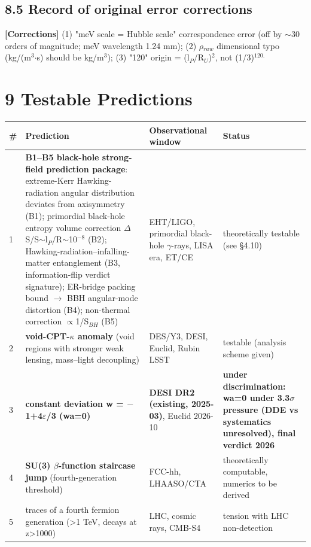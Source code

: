 \documentclass[12pt]{article}
\newcommand{\mtag}[1]{\textbf{[#1]}}
\newcommand{\up}[1]{\ensuremath{^{#1}}}
\newcommand{\down}[1]{\ensuremath{_{#1}}}
\begin{document}
\subsection{8.5 Record of original error corrections}

\mtag{Corrections} (1) "meV scale = Hubble scale" correspondence error (off by \ensuremath{\sim}30 orders of magnitude; meV wavelength 1.24 mm); (2) \ensuremath{\rho}\down{raw} dimensional typo (kg/(m\up{3}\ensuremath{\cdot}s) should be kg/m\up{3}); (3) "120" origin = (l\down{P}/R\down{U})\up{2}, not (1/3)\up{120.}


\section{9 Testable Predictions}

\begin{table}[htbp]
\centering
\small
\begin{tabularx}{\textwidth}{@{}lXXX@{}}
\toprule
\# & Prediction & Observational window & Status \\
\midrule
1 & \textbf{B1--B5 black-hole strong-field prediction package}: extreme-Kerr Hawking-radiation angular distribution deviates from axisymmetry (B1); primordial black-hole entropy volume correction \ensuremath{\Delta}S/S\ensuremath{\sim}l\down{P}/R\ensuremath{\sim}10\up{-8} (B2); Hawking-radiation--infalling-matter entanglement (B3, information-flip verdict signature); ER-bridge packing bound \ensuremath{\to} BBH angular-mode distortion (B4); non-thermal correction \ensuremath{\propto}1/S\down{BH} (B5) & EHT/LIGO, primordial black-hole \ensuremath{\gamma}-rays, LISA era, ET/CE & theoretically testable (see \S{}4.10) \\
2 & \textbf{void-CPT-\ensuremath{\kappa} anomaly} (void regions with stronger weak lensing, mass--light decoupling) & DES/Y3, DESI, Euclid, Rubin LSST & testable (analysis scheme given) \\
3 & \textbf{constant deviation w = \ensuremath{-}1+4\ensuremath{\varepsilon}/3 (wa=0)} & \textbf{DESI DR2 (existing, 2025-03)}, Euclid 2026-10 & \textbf{under discrimination: wa=0 under 3.3\ensuremath{\sigma} pressure (DDE vs systematics unresolved), final verdict 2026} \\
4 & \textbf{SU(3) \ensuremath{\beta}-function staircase jump} (fourth-generation threshold) & FCC-hh, LHAASO/CTA & theoretically computable, numerics to be derived \\
5 & traces of a fourth fermion generation (>1 TeV, decays at z>1000) & LHC, cosmic rays, CMB-S4 & tension with LHC non-detection \\

\end{tabularx}
\end{table}
\end{document}
